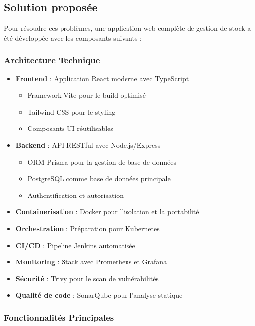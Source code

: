 \documentclass[12pt,a4paper]{report}
\begin{document}
\subsection{Solution proposée}

Pour résoudre ces problèmes, une application web complète de gestion de stock a été développée avec les composants suivants :

\subsubsection{Architecture Technique}

\begin{itemize}
    \item \textbf{Frontend} : Application React moderne avec TypeScript
    \begin{itemize}
        \item Framework Vite pour le build optimisé
        \item Tailwind CSS pour le styling
        \item Composants UI réutilisables
    \end{itemize}
    
    \item \textbf{Backend} : API RESTful avec Node.js/Express
    \begin{itemize}
        \item ORM Prisma pour la gestion de base de données
        \item PostgreSQL comme base de données principale
        \item Authentification et autorisation
    \end{itemize}
    
    \item \textbf{Containerisation} : Docker pour l'isolation et la portabilité
    \item \textbf{Orchestration} : Préparation pour Kubernetes
    \item \textbf{CI/CD} : Pipeline Jenkins automatisée
    \item \textbf{Monitoring} : Stack avec Prometheus et Grafana
    \item \textbf{Sécurité} : Trivy pour le scan de vulnérabilités
    \item \textbf{Qualité de code} : SonarQube pour l'analyse statique
\end{itemize}

\subsubsection{Fonctionnalités Principales}
\end{document}

